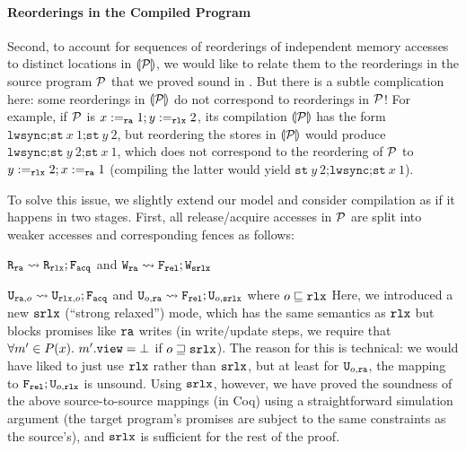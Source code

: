 \paragraph{Reorderings in the Compiled Program}
Second, to account for sequences of reorderings of independent memory accesses to distinct locations in  ${\llparenthesis{\mathcal{P}}\rrparenthesis}$,
we would like to relate them to the reorderings in the source program $\mathcal{P}$
that we proved sound in .
But there is a subtle complication here: some reorderings in ${\llparenthesis{\mathcal{P}}\rrparenthesis}$ do not correspond 
to reorderings in $\mathcal{P}$! For example, if $\mathcal{P}$ is $x:=_{\texttt{ra}} 1;y:=_{\texttt{rlx}} 2$, its compilation ${\llparenthesis{\mathcal{P}}\rrparenthesis}$
has the form $\texttt{lwsync;st}\ x\ 1\texttt{;st}\ y\ 2$, but reordering the stores in ${\llparenthesis{\mathcal{P}}\rrparenthesis}$ would produce $\texttt{lwsync;st}\ y\ 2\texttt{;st}\ x\ 1$, which
does not correspond to the reordering of $\mathcal{P}$ to $y:=_{\texttt{rlx}} 2;x:=_{\texttt{ra}} 1$ (compiling the latter would yield $\texttt{st}\ y\ 2\texttt{;lwsync;st}\ x\ 1$).

To solve this issue, we slightly extend our model and consider compilation as if it happens in two stages.
First, all release/acquire accesses in $\mathcal{P}$ are split into weaker accesses and corresponding fences as follows:
\squishlist
\item $\texttt{R}_{\texttt{ra}} \leadsto \texttt{R}_{\texttt{rlx}} ; \texttt{F}_{\texttt{acq}}$  and $\texttt{W}_{\texttt{ra}} \leadsto \texttt{F}_{\texttt{rel}} ; \texttt{W}_{\texttt{srlx}}$ 
\item $\texttt{U}_{\texttt{ra},o} \leadsto \texttt{U}_{\texttt{rlx},o} ; \texttt{F}_{\texttt{acq}}$ and $\texttt{U}_{o,\texttt{ra}} \leadsto \texttt{F}_{\texttt{rel}} ; \texttt{U}_{o,{\texttt{srlx}}}$ where $o \sqsubseteq\texttt{rlx}$
\squishend
Here, we introduced a new ${\texttt{srlx}}$ (``strong relaxed'') mode, which has the same semantics as $\texttt{rlx}$
but blocks promises like $\texttt{ra}$ writes (\ie in write/update steps, we require
that  ${\forall m' \in P(x).~ m'.\texttt{view} = \bot}$ if $o \sqsupseteq {\texttt{srlx}}$).
The reason for this is technical: we would have liked to just use $\texttt{rlx}$ rather
than ${\texttt{srlx}}$, but at least for $\texttt{U}_{o,\texttt{ra}}$, the mapping to $\texttt{F}_{\texttt{rel}} ; \texttt{U}_{o,\texttt{rlx}}$ is unsound.  Using ${\texttt{srlx}}$, however, we have proved the soundness of the above source-to-source mappings (in Coq) using a straightforward 
simulation argument (the target program's promises are subject to the same constraints as the source's), and ${\texttt{srlx}}$ is sufficient for the rest of the proof.


